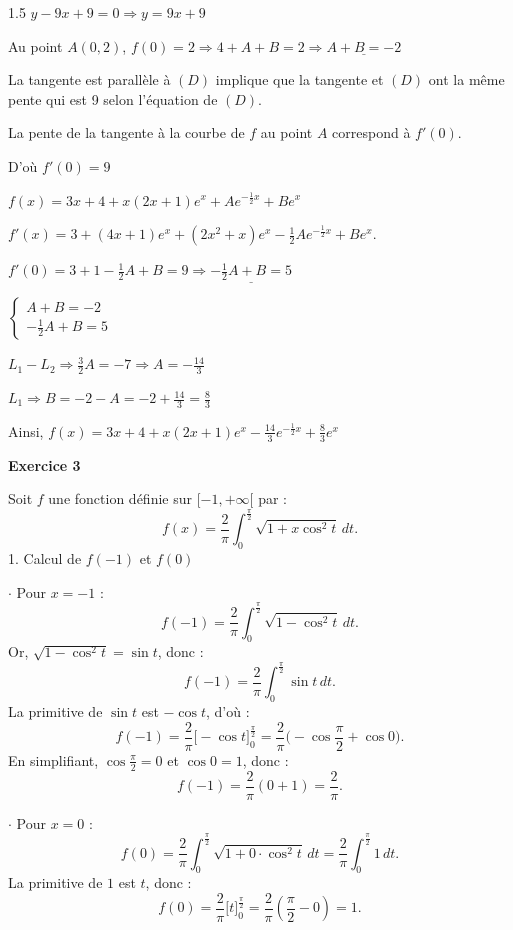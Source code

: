 \documentclass[12pt]{article}
\begin{document}
\begin{spacing}{1.5}
$y-9x+9=0\Rightarrow y=9x+9$

Au point $A(0,2)$, $f(0)=2\Rightarrow 4 + A +B =2\Rightarrow \underline{A+B=-2}$

La tangente est parallèle à $(D)$ implique que la tangente et $(D)$ ont la même pente qui est 9 selon l'équation de $(D)$.

La pente de la tangente à la courbe de $f$ au point $A$ correspond à $f'(0)$.

D'où $f'(0)=9$

$f(x)=3x+4+x(2x+1)e^x+Ae^{-\frac{1}{2}x}+Be^x$

$f'(x)=3+(4x+1)e^x+(2x^2+x)e^x-\frac{1}{2}Ae^{-\frac{1}{2}x}+Be^x$.

$f'(0)=3+1-\frac{1}{2}A+B=9\Rightarrow \underline{-\frac{1}{2}A+B=5}$

$\begin{cases}
A+B=-2\\
-\frac{1}{2}A+B=5
\end{cases}$

$L_1-L_2\Longrightarrow \frac{3}{2}A=-7\Longrightarrow A=-\frac{14}{3}$

$L_1\Longrightarrow B=-2-A=-2+\frac{14}{3}=\frac{8}{3}$

Ainsi, $f(x)=3x+4+x(2x+1)e^x-\frac{14}{3}e^{-\frac{1}{2}x}+\frac{8}{3}e^x$


\medskip\textbf{Exercice 3}





Soit $f$ une fonction définie sur $[-1, +\infty[$ par :
\[
f(x) = \frac{2}{\pi} \int_{0}^{\frac{\pi}{2}} \sqrt{1 + x \cos^2 t} \, dt.
\]
1. Calcul de $f(-1)$ et $f(0)$

$\cdot$ Pour $x = -1$ :
\[
f(-1) = \frac{2}{\pi} \int_{0}^{\frac{\pi}{2}} \sqrt{1 - \cos^2 t} \, dt.
\]
Or, $\sqrt{1 - \cos^2 t} = \sin t$, donc :
\[
f(-1) = \frac{2}{\pi} \int_{0}^{\frac{\pi}{2}} \sin t \, dt.
\]
La primitive de $\sin t$ est $-\cos t$, d'où :
\[
f(-1) = \frac{2}{\pi} \big[ -\cos t \big]_{0}^{\frac{\pi}{2}} = \frac{2}{\pi} \big( -\cos\frac{\pi}{2} + \cos 0 \big).
\]
En simplifiant, $\cos \frac{\pi}{2} = 0$ et $\cos 0 = 1$, donc :
\[
f(-1) = \frac{2}{\pi} (0 + 1) = \frac{2}{\pi}.
\]

$\cdot$ Pour $x = 0$ :
\[
f(0) = \frac{2}{\pi} \int_{0}^{\frac{\pi}{2}} \sqrt{1 + 0 \cdot \cos^2 t} \, dt = \frac{2}{\pi} \int_{0}^{\frac{\pi}{2}} 1 \, dt.
\]
La primitive de $1$ est $t$, donc :
\[
f(0) = \frac{2}{\pi} \big[ t \big]_0^{\frac{\pi}{2}} = \frac{2}{\pi} \left( \frac{\pi}{2} - 0 \right) = 1.
\]


\end{spacing}
\end{document}
